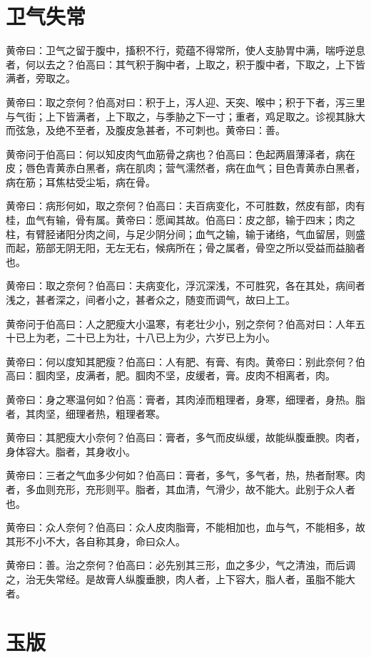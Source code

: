 \documentclass[12pt,UTF8]{ctexbook}
\begin{document}
	
	\chapter{卫气失常}
	
	黄帝曰：卫气之留于腹中，搐积不行，菀蕴不得常所，使人支胁胃中满，喘呼逆息者，何以去之？伯高曰：其气积于胸中者，上取之，积于腹中者，下取之，上下皆满者，旁取之。
	
	黄帝曰：取之奈何？伯高对曰：积于上，泻人迎、天突、喉中；积于下者，泻三里与气街；上下皆满者，上下取之，与季胁之下一寸；重者，鸡足取之。诊视其脉大而弦急，及绝不至者，及腹皮急甚者，不可刺也。黄帝曰：善。
	
	黄帝问于伯高曰：何以知皮肉气血筋骨之病也？伯高曰：色起两眉薄泽者，病在皮；唇色青黄赤白黑者，病在肌肉；营气濡然者，病在血气；目色青黄赤白黑者，病在筋；耳焦枯受尘垢，病在骨。
	
	黄帝曰：病形何如，取之奈何？伯高曰：夫百病变化，不可胜数，然皮有部，肉有桂，血气有输，骨有属。黄帝曰：愿闻其故。伯高曰：皮之部，输于四末；肉之柱，有臂胫诸阳分肉之间，与足少阴分间；血气之输，输于诸络，气血留居，则盛而起，筋部无阴无阳，无左无右，候病所在；骨之属者，骨空之所以受益而益脑者也。
	
	黄帝曰：取之奈何？伯高曰：夫病变化，浮沉深浅，不可胜究，各在其处，病间者浅之，甚者深之，间者小之，甚者众之，随变而调气，故曰上工。
	
	黄帝问于伯高曰：人之肥瘦大小温寒，有老壮少小，别之奈何？伯高对曰：人年五十已上为老，二十已上为壮，十八已上为少，六岁已上为小。
	
	黄帝曰：何以度知其肥瘦？伯高曰：人有肥、有膏、有肉。黄帝曰：别此奈何？伯高曰：腘肉坚，皮满者，肥。腘肉不坚，皮缓者，膏。皮肉不相离者，肉。
	
	黄帝曰：身之寒温何如？伯高：膏者，其肉淖而粗理者，身寒，细理者，身热。脂者，其肉坚，细理者热，粗理者寒。
	
	黄帝曰：其肥瘦大小奈何？伯高曰：膏者，多气而皮纵缓，故能纵腹垂腴。肉者，身体容大。脂者，其身收小。
	
	黄帝曰：三者之气血多少何如？伯高曰：膏者，多气，多气者，热，热者耐寒。肉者，多血则充形，充形则平。脂者，其血清，气滑少，故不能大。此别于众人者也。
	
	黄帝曰：众人奈何？伯高曰：众人皮肉脂膏，不能相加也，血与气，不能相多，故其形不小不大，各自称其身，命曰众人。
	
	黄帝曰：善。治之奈何？伯高曰：必先别其三形，血之多少，气之清浊，而后调之，治无失常经。是故膏人纵腹垂腴，肉人者，上下容大，脂人者，虽脂不能大者。
	\chapter{玉版}
	
\end{document}

